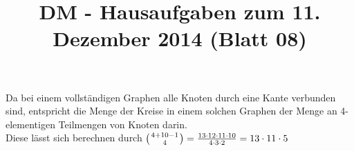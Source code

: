 \documentclass[fleqn]{article}
\title{DM - Hausaufgaben zum 11. Dezember 2014 (Blatt 08)}
\author{}
\date{\gertoday}
\newcommand*{\bfrac}[2]{\genfrac{}{}{0pt}{}{#1}{#2}}
\begin{document}
\maketitle
\section{}
Da bei einem vollständigen Graphen alle Knoten durch eine Kante verbunden sind, entspricht die Menge der Kreise in einem solchen Graphen der Menge an 4-elementigen Teilmengen von Knoten darin.\\
Diese lässt sich berechnen durch $\left( \bfrac{4+10-1}{4}\right) = \frac{13 \cdot 12 \cdot 11 \cdot 10}{4 \cdot 3 \cdot 2 } = 13 \cdot 11 \cdot 5 $
\end{document}
